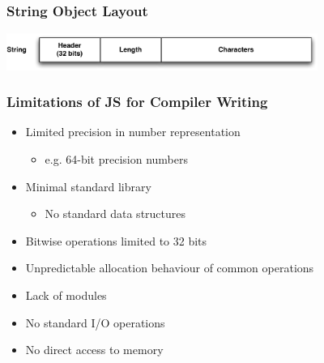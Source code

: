 \begin{frame}
\frametitle{\bf String Object Layout}

\begin{center}
\includegraphics[width=4in]{images/obj_layout_str}
\end{center}
\end{frame}

% 

% 

\begin{frame}
\frametitle{\bf Limitations of JS for Compiler Writing}

    \begin{itemize}
        \item Limited precision in number representation
        \begin{itemize}
            \item e.g. 64-bit precision numbers
        \end{itemize}
        \item Minimal standard library
        \begin{itemize}
            \item No standard data structures
        \end{itemize}
        \item Bitwise operations limited to 32 bits
        \item Unpredictable allocation behaviour of common operations
        \item Lack of modules
        \item No standard I/O operations
        \item No direct access to memory
    \end{itemize}
\end{frame}

